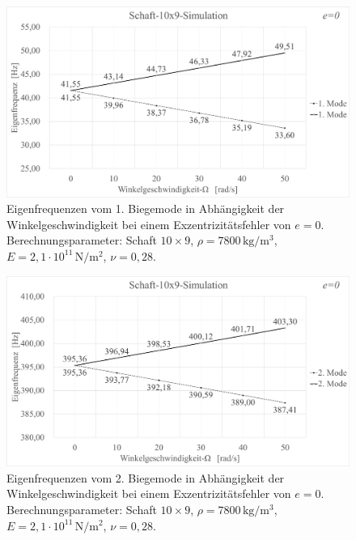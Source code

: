 	\begin{figure}[H]
		\centering
		\includegraphics[width=0.95\linewidth, height=0.36\textheight]{Ergebnisse/Schaft_10x9_1Mode_Simu}
		\caption{Eigenfrequenzen vom 1. Biegemode in Abhängigkeit der Winkelgeschwindigkeit bei einem Exzentrizitätsfehler von $ e=0 $. Berechnungsparameter: Schaft $ 10\times9 $, $\rho = 7800 \,\text{kg}/\text{m}^{3} $, $ E=2,1\cdot 10^{11} \,\text{N}/\text{m}^{2} $, $ \nu=0,28 $.}
		\label{fig:Result-Schaft-10x9-Simulation-1-Mode}
	\end{figure}
	
	\begin{figure}[H]
		\centering
		\includegraphics[width=0.95\linewidth, height=0.36\textheight]{Ergebnisse/Schaft_10x9_2Mode_Simu}
		\caption{Eigenfrequenzen vom 2. Biegemode in Abhängigkeit der Winkelgeschwindigkeit bei einem Exzentrizitätsfehler von $ e=0 $. Berechnungsparameter: Schaft $ 10\times9 $, $\rho = 7800 \,\text{kg}/\text{m}^{3} $, $ E=2,1\cdot 10^{11} \,\text{N}/\text{m}^{2} $, $ \nu=0,28 $.}
		\label{fig:Result-Schaft-10x9-Simulation-2-Mode}
	\end{figure}

